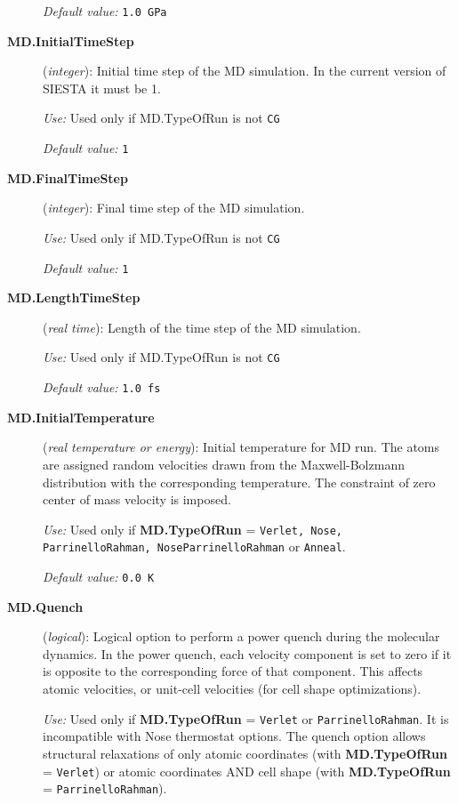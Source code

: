\begin{description}
{\it Default value:} {\tt 1.0 GPa}
 
   
\item[{\bf MD.InitialTimeStep}] ({\it integer}): 
Initial time step of the MD simulation.
In the current version of SIESTA it must be 1.

{\it Use:} Used only if MD.TypeOfRun is not {\tt CG}
    
{\it Default value:} {\tt 1}

\item[{\bf MD.FinalTimeStep}] ({\it integer}): 
Final time step of the MD simulation.

{\it Use:} Used only if MD.TypeOfRun is not {\tt CG}
    
{\it Default value:} {\tt 1}

\item[{\bf MD.LengthTimeStep}] ({\it real time}): 
Length of the time step of the MD simulation.

{\it Use:} Used only if MD.TypeOfRun is not {\tt CG}
    
{\it Default value:} {\tt 1.0 fs}

\item[{\bf MD.InitialTemperature}] ({\it real temperature or energy}): 
Initial temperature for MD run. The atoms are assigned random 
velocities drawn from the Maxwell-Bolzmann distribution with the
corresponding temperature. The constraint of zero center of
mass velocity is imposed.

{\it Use:} Used only if {\bf MD.TypeOfRun} = {\tt Verlet, Nose, 
ParrinelloRahman, NoseParrinelloRahman}
or {\tt Anneal}.

{\it Default value:} {\tt 0.0 K}

\item[{\bf MD.Quench}] ({\it logical}): 
Logical option to perform a power quench during the molecular dynamics. 
In the power quench, each velocity component is set to
zero if it is opposite to the corresponding force
of that component. This affects atomic velocities,
or unit-cell velocities (for cell shape optimizations).

{\it Use:} Used only if {\bf MD.TypeOfRun} = {\tt Verlet} or 
{\tt ParrinelloRahman}.
It is incompatible with Nose thermostat options.
The quench option allows structural relaxations of
only atomic coordinates (with {\bf MD.TypeOfRun} = {\tt Verlet})
or atomic coordinates AND cell shape 
(with {\bf MD.TypeOfRun} = {\tt ParrinelloRahman}).


\end{description}
